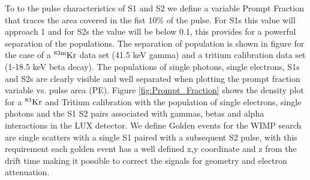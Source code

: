 To to the pulse characteristics of S1 and S2 we define a variable Prompt Fraction that traces the area covered in the fist 10\% of the pulse. For S1s this value will approach 1 and for S2s the value will be below 0.1, this provides for a powerful separation of the populations. The separation of population is shown in figure for the case of a $\rm ^{83m}Kr$ data set (41.5 keV gamma) and a tritium calibration data set (1-18.5 keV beta decay). The populations of single photons, single electrons, S1s and S2s are clearly visible and well separated when plotting the prompt  fraction variable vs. pulse area (PE). Figure \ref{fig:Prompt_Fraction} shows the density plot for a $\rm^{83}Kr$ and Tritium calibration with the population of single electrons, single photons and the S1 S2 pairs associated with gammas, betas and alpha interactions in the LUX detector. We define Golden events for the WIMP search are single scatters with a single S1 paired with a subsequent S2 pulse, with this requirement each golden event has a well defined x,y coordinate and z from the drift time making it possible to correct the signals for geometry and electron attenuation.


